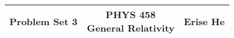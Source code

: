 \documentclass[12pt]{article}
\begin{document}
\thispagestyle{plain}
\vspace{-4ex}  %


\begin{center}
\begin{tabular}{*{3}{c}}
    \parbox[t]{0.3\linewidth}{\centering\textbf{Problem Set 3}}
    & \parbox[t]{0.3\linewidth}{\centering\textbf{PHYS 458\\General Relativity}}
    & \parbox[t]{0.3\linewidth}{\centering\textbf{Erise He}}\\[2em]
    \hline
\end{tabular}
\end{center}

\bigskip

\end{document}
